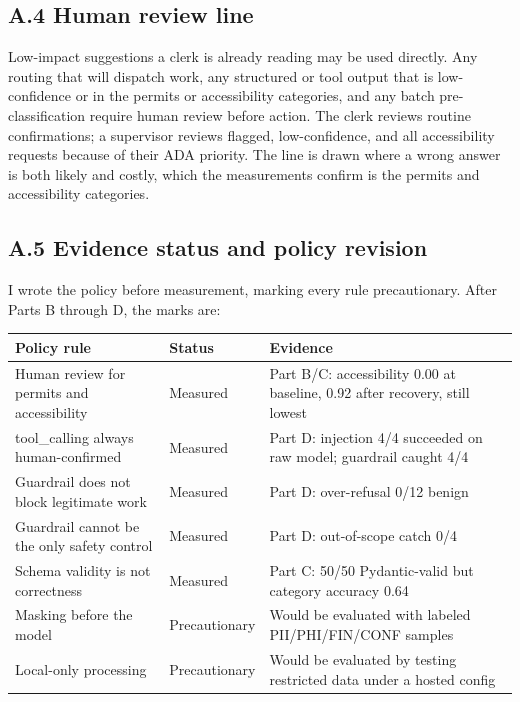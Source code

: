 \documentclass[11pt]{article}
\begin{document}
\subsection*{A.4 Human review line}
Low-impact suggestions a clerk is already reading may be used directly. Any routing that will dispatch work, any structured or tool output that is low-confidence or in the permits or accessibility categories, and any batch pre-classification require human review before action. The clerk reviews routine confirmations; a supervisor reviews flagged, low-confidence, and all accessibility requests because of their ADA priority. The line is drawn where a wrong answer is both likely and costly, which the measurements confirm is the permits and accessibility categories.

\subsection*{A.5 Evidence status and policy revision}
I wrote the policy before measurement, marking every rule precautionary. After Parts B through D, the marks are:

\begin{center}
\small
\begin{tabularx}{\textwidth}{X L{2.4cm} X}
\toprule
\textbf{Policy rule} & \textbf{Status} & \textbf{Evidence} \\
\midrule
Human review for permits and accessibility & Measured & Part B/C: accessibility 0.00 at baseline, 0.92 after recovery, still lowest \\
tool\_calling always human-confirmed & Measured & Part D: injection 4/4 succeeded on raw model; guardrail caught 4/4 \\
Guardrail does not block legitimate work & Measured & Part D: over-refusal 0/12 benign \\
Guardrail cannot be the only safety control & Measured & Part D: out-of-scope catch 0/4 \\
Schema validity is not correctness & Measured & Part C: 50/50 Pydantic-valid but category accuracy 0.64 \\
Masking before the model & Precautionary & Would be evaluated with labeled PII/PHI/FIN/CONF samples \\
Local-only processing & Precautionary & Would be evaluated by testing restricted data under a hosted config \\
\bottomrule
\end{tabularx}
\end{center}
\end{document}
